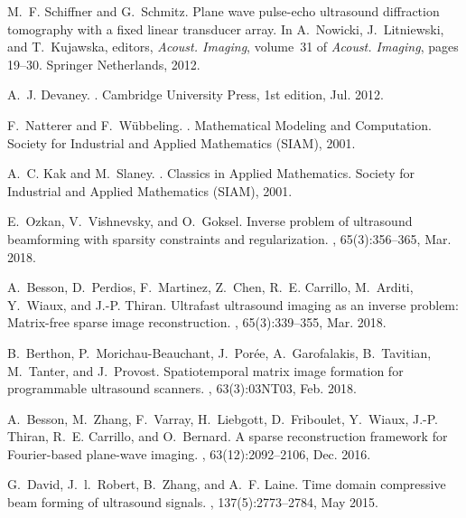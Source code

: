 \documentclass[10pt,twocolumn,romanappendices,final]{IEEEtran}
\begin{document}
\begin{thebibliography}{100}
M.~F. Schiffner and G.~Schmitz.
\newblock Plane wave pulse-echo ultrasound diffraction tomography with a fixed
  linear transducer array.
\newblock In A.~Nowicki, J.~Litniewski, and T.~Kujawska, editors, {\em Acoust.
  Imaging}, volume~31 of {\em Acoust. Imaging}, pages 19--30. Springer
  Netherlands, 2012.

A.~J. Devaney.
.
\newblock Cambridge University Press, 1st edition, Jul. 2012.

F.~Natterer and F.~Wübbeling.
.
\newblock Mathematical Modeling and Computation. Society for Industrial and
  Applied Mathematics (SIAM), 2001.

A.~C. Kak and M.~Slaney.
.
\newblock Classics in Applied Mathematics. Society for Industrial and Applied
  Mathematics (SIAM), 2001.

E.~Ozkan, V.~Vishnevsky, and O.~Goksel.
\newblock Inverse problem of ultrasound beamforming with sparsity constraints
  and regularization.
,
  65(3):356--365, Mar. 2018.

A.~Besson, D.~Perdios, F.~Martinez, Z.~Chen, R.~E. Carrillo, M.~Arditi,
  Y.~Wiaux, and J.-P. Thiran.
\newblock Ultrafast ultrasound imaging as an inverse problem: {M}atrix-free
  sparse image reconstruction.
,
  65(3):339--355, Mar. 2018.

B.~Berthon, P.~Morichau-Beauchant, J.~Porée, A.~Garofalakis, B.~Tavitian,
  M.~Tanter, and J.~Provost.
\newblock Spatiotemporal matrix image formation for programmable ultrasound
  scanners.
, 63(3):03NT03, Feb. 2018.

A.~Besson, M.~Zhang, F.~Varray, H.~Liebgott, D.~Friboulet, Y.~Wiaux, J.-P.
  Thiran, R.~E. Carrillo, and O.~Bernard.
\newblock A sparse reconstruction framework for {F}ourier-based plane-wave
  imaging.
,
  63(12):2092--2106, Dec. 2016.

G.~David, J.~l.~Robert, B.~Zhang, and A.~F. Laine.
\newblock Time domain compressive beam forming of ultrasound signals.
, 137(5):2773--2784, May 2015.


\end{thebibliography}
\end{document}
